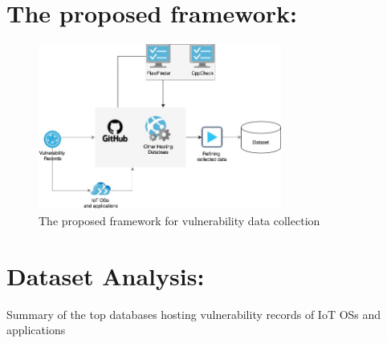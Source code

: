\documentclass[conference]{IEEEtran}
\begin{document}
\section{The proposed framework:}

\begin{figure}[h!]
  \centering
  \includegraphics[width=8cm]{../figure/framework.jpg}
  \vspace*{-1.5ex}
  \caption{The proposed framework for vulnerability data collection}
  \label{fig:lcurve-iot}
\end{figure}


\section{Dataset Analysis:}

\begin{table}[!t]
  \centering
  {\csvlinetotablerow}
  \caption{Summary of the top databases hosting vulnerability records of IoT OSs and applications}
  \label{tab:software}
  \end{table}
\end{document}

